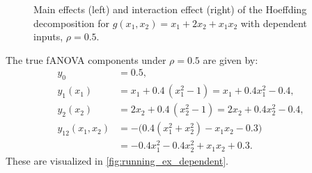 \begin{figure}[htpb]
\begin{subfigure}[t]{0.49\textwidth}
    \end{subfigure}
    \caption{Main effects (left) and interaction effect (right) of the Hoeffding decomposition for $g(x_1, x_2) = x_1 + 2 x_2 + x_1 x_2$ with dependent inputs, $\rho = 0.5$.}
    \label{fig:hoeffding_rho05}
\end{figure}
The true fANOVA components under $\rho = 0.5$ are given by:
\begin{align*}
y_0 &= 0.5, \\[3pt]
y_1(x_1) &= x_1 + 0.4\,(x_1^2 - 1)
        = x_1 + 0.4x_1^2 - 0.4, \\[3pt]
y_2(x_2) &= 2x_2 + 0.4\,(x_2^2 - 1)
        = 2x_2 + 0.4x_2^2 - 0.4, \\[3pt]
y_{12}(x_1,x_2) 
&= -\Big( 0.4(x_1^2 + x_2^2) - x_1 x_2 - 0.3 \Big) \\[3pt]
&= -0.4x_1^2 - 0.4x_2^2 + x_1 x_2 + 0.3.
\end{align*}
These are visualized in \autoref{fig:running_ex_dependent}.
